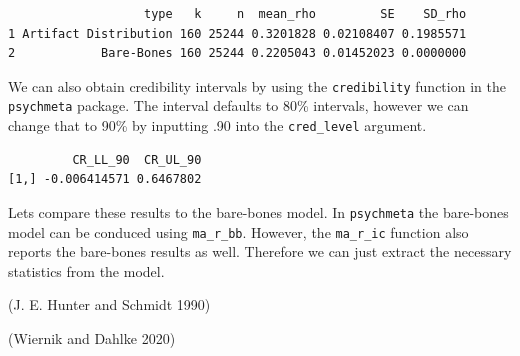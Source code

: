 \documentclass[
  letterpaper,
  DIV=11,
  numbers=noendperiod]{scrreprt}
\newenvironment{Shaded}{\begin{snugshade}}{\end{snugshade}}
\newcommand{\AttributeTok}[1]{\textcolor[rgb]{0.40,0.45,0.13}{#1}}
\newcommand{\DecValTok}[1]{\textcolor[rgb]{0.68,0.00,0.00}{#1}}
\newcommand{\FunctionTok}[1]{\textcolor[rgb]{0.28,0.35,0.67}{#1}}
\newcommand{\NormalTok}[1]{\textcolor[rgb]{0.00,0.23,0.31}{#1}}
\newcommand{\SpecialCharTok}[1]{\textcolor[rgb]{0.37,0.37,0.37}{#1}}
\newcommand{\StringTok}[1]{\textcolor[rgb]{0.13,0.47,0.30}{#1}}
\begin{document}
\begin{Shaded}
\end{Shaded}

\begin{verbatim}
                   type   k     n  mean_rho         SE    SD_rho
1 Artifact Distribution 160 25244 0.3201828 0.02108407 0.1985571
2            Bare-Bones 160 25244 0.2205043 0.01452023 0.0000000
\end{verbatim}

We can also obtain credibility intervals by using the
\texttt{credibility} function in the \texttt{psychmeta} package. The
interval defaults to 80\% intervals, however we can change that to 90\%
by inputting .90 into the \texttt{cred\_level} argument.

\begin{Shaded}
\end{Shaded}

\begin{verbatim}
         CR_LL_90  CR_UL_90
[1,] -0.006414571 0.6467802
\end{verbatim}

Lets compare these results to the bare-bones model. In
\texttt{psychmeta} the bare-bones model can be conduced using
\texttt{ma\_r\_bb}. However, the \texttt{ma\_r\_ic} function also
reports the bare-bones results as well. Therefore we can just extract
the necessary statistics from the model.

(J. E. Hunter and Schmidt 1990)

(Wiernik and Dahlke 2020)
\end{document}
